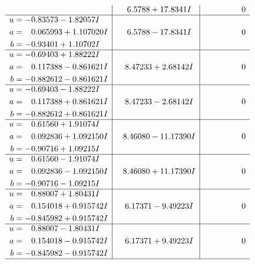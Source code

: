 \documentclass[1p]{elsarticle_modified}
\theoremstyle{definition}
\begin{document}
$$\begin{array}{c|c|c}
 & \phantom{-}6.5788 + 17.8341 I & \phantom{-0.000000 } 0 \\ \hline\begin{aligned}
u &= -0.83573 - 1.82057 I \\
a &= \phantom{-}0.065993 + 1.107020 I \\
b &= -0.93401 + 1.10702 I\end{aligned}
 & \phantom{-}6.5788 - 17.8341 I & \phantom{-0.000000 } 0 \\ \hline\begin{aligned}
u &= -0.69403 + 1.88222 I \\
a &= \phantom{-}0.117388 - 0.861621 I \\
b &= -0.882612 - 0.861621 I\end{aligned}
 & \phantom{-}8.47233 + 2.68142 I & \phantom{-0.000000 } 0 \\ \hline\begin{aligned}
u &= -0.69403 - 1.88222 I \\
a &= \phantom{-}0.117388 + 0.861621 I \\
b &= -0.882612 + 0.861621 I\end{aligned}
 & \phantom{-}8.47233 - 2.68142 I & \phantom{-0.000000 } 0 \\ \hline\begin{aligned}
u &= \phantom{-}0.61560 + 1.91074 I \\
a &= \phantom{-}0.092836 + 1.092150 I \\
b &= -0.90716 + 1.09215 I\end{aligned}
 & \phantom{-}8.46080 - 11.17390 I & \phantom{-0.000000 } 0 \\ \hline\begin{aligned}
u &= \phantom{-}0.61560 - 1.91074 I \\
a &= \phantom{-}0.092836 - 1.092150 I \\
b &= -0.90716 - 1.09215 I\end{aligned}
 & \phantom{-}8.46080 + 11.17390 I & \phantom{-0.000000 } 0 \\ \hline\begin{aligned}
u &= \phantom{-}0.88007 + 1.80431 I \\
a &= \phantom{-}0.154018 + 0.915742 I \\
b &= -0.845982 + 0.915742 I\end{aligned}
 & \phantom{-}6.17371 - 9.49223 I & \phantom{-0.000000 } 0 \\ \hline\begin{aligned}
u &= \phantom{-}0.88007 - 1.80431 I \\
a &= \phantom{-}0.154018 - 0.915742 I \\
b &= -0.845982 - 0.915742 I\end{aligned}
 & \phantom{-}6.17371 + 9.49223 I & \phantom{-0.000000 } 0\\
 \hline 
 \end{array}$$\newpage\newpage\renewcommand{\arraystretch}{1}
\end{document}
